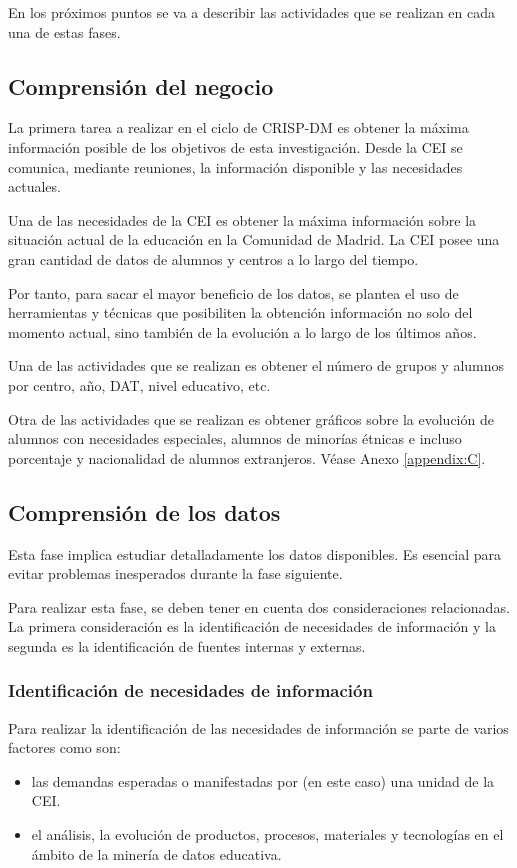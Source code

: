 En los próximos puntos se va a describir las actividades que se realizan en cada una de estas fases.

\subsection{Comprensión del negocio}
La primera tarea a realizar en el ciclo de CRISP-DM es obtener la máxima información posible de los objetivos de esta investigación. Desde la CEI se comunica, mediante reuniones, la información disponible y las necesidades actuales.

Una de las necesidades de la CEI es obtener la máxima información sobre la situación actual de la educación en la Comunidad de Madrid. La CEI posee una gran cantidad de datos de alumnos y centros a lo largo del tiempo. 

Por tanto, para sacar el mayor beneficio de los datos, se plantea el uso de herramientas y técnicas que posibiliten la obtención información no solo del momento actual, sino también de la evolución a lo largo de los últimos años.

Una de las actividades que se realizan es obtener el número de grupos y alumnos por centro, año, DAT, nivel educativo, etc.

Otra de las actividades que se realizan es obtener gráficos sobre la evolución de alumnos con necesidades especiales, alumnos de minorías étnicas e incluso porcentaje y nacionalidad de alumnos extranjeros. Véase Anexo \ref{appendix:C}.

\subsection{Comprensión de los datos}
Esta fase implica estudiar detalladamente los datos disponibles. Es esencial para evitar problemas inesperados durante la fase siguiente.

Para realizar esta fase, se deben tener en cuenta dos consideraciones relacionadas. La primera consideración es la identificación de necesidades de información y la segunda es la identificación de fuentes internas y externas.

\subsubsection{Identificación de necesidades de información}

Para realizar la identificación de las necesidades de información se parte de varios factores como son:
\begin{itemize}
	\item las demandas esperadas o manifestadas por (en este caso) una unidad de la CEI.
	\item el análisis, la evolución de productos, procesos, materiales y tecnologías en el ámbito de la minería de datos educativa.
\end{itemize}

